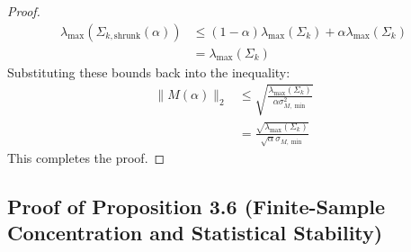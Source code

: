 \documentclass{article}
\theoremstyle{plain}
\theoremstyle{definition}
\theoremstyle{remark}
\begin{document}
\begin{proof}
\begin{align*}
  \lambda_{\max}\left(\Sigma_{k,\text{shrunk}}(\alpha)\right) &\leq (1 - \alpha) \lambda_{\max}(\Sigma_k) + \alpha \lambda_{\max}(\Sigma_k) \\
  &= \lambda_{\max}(\Sigma_k)
\end{align*}
Substituting these bounds back into the inequality:
\begin{align*}
  \| M(\alpha) \|_2 &\leq \sqrt{ \frac{\lambda_{\max}(\Sigma_k)}{\alpha \sigma_{M,\min}^2} } \\
  &= \frac{\sqrt{\lambda_{\max}(\Sigma_k)}}{\sqrt{\alpha} \sigma_{M,\min}}
\end{align*}
This completes the proof.
\end{proof}

\subsection{Proof of Proposition 3.6 (Finite-Sample Concentration and Statistical Stability)}
\label{sec:proofs_concentration}
\end{document}
